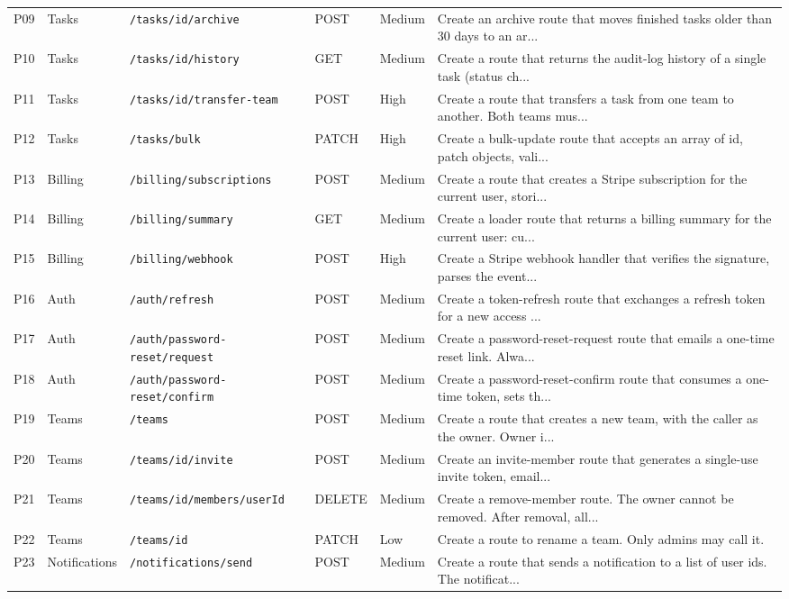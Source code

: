 \documentclass[review,12pt,3p]{elsarticle}
\begin{document}
\begin{table}[htbp]
{\begin{tabular}{llllll}
P09 & Tasks & \texttt{/tasks/\:id/archive} & POST & Medium & Create an archive route that moves finished tasks older than 30 days to an ar... \\
P10 & Tasks & \texttt{/tasks/\:id/history} & GET & Medium & Create a route that returns the audit-log history of a single task (status ch... \\
P11 & Tasks & \texttt{/tasks/\:id/transfer-team} & POST & High & Create a route that transfers a task from one team to another. Both teams mus... \\
P12 & Tasks & \texttt{/tasks/bulk} & PATCH & High & Create a bulk-update route that accepts an array of {id, patch} objects, vali... \\
P13 & Billing & \texttt{/billing/subscriptions} & POST & Medium & Create a route that creates a Stripe subscription for the current user, stori... \\
P14 & Billing & \texttt{/billing/summary} & GET & Medium & Create a loader route that returns a billing summary for the current user: cu... \\
P15 & Billing & \texttt{/billing/webhook} & POST & High & Create a Stripe webhook handler that verifies the signature, parses the event... \\
P16 & Auth & \texttt{/auth/refresh} & POST & Medium & Create a token-refresh route that exchanges a refresh token for a new access ... \\
P17 & Auth & \texttt{/auth/password-reset/request} & POST & Medium & Create a password-reset-request route that emails a one-time reset link. Alwa... \\
P18 & Auth & \texttt{/auth/password-reset/confirm} & POST & Medium & Create a password-reset-confirm route that consumes a one-time token, sets th... \\
P19 & Teams & \texttt{/teams} & POST & Medium & Create a route that creates a new team, with the caller as the owner. Owner i... \\
P20 & Teams & \texttt{/teams/\:id/invite} & POST & Medium & Create an invite-member route that generates a single-use invite token, email... \\
P21 & Teams & \texttt{/teams/\:id/members/\:userId} & DELETE & Medium & Create a remove-member route. The owner cannot be removed. After removal, all... \\
P22 & Teams & \texttt{/teams/\:id} & PATCH & Low & Create a route to rename a team. Only admins may call it. \\
P23 & Notifications & \texttt{/notifications/send} & POST & Medium & Create a route that sends a notification to a list of user ids. The notificat... \\

\end{tabular}}
\end{table}
\end{document}

